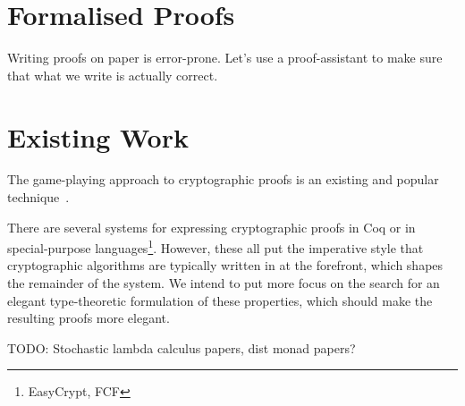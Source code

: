 % 
% 
% 

\section{Formalised Proofs}

Writing proofs on paper is error-prone.  Let's use a proof-assistant to make sure that what we write is actually
correct.

\section{Existing Work}

The game-playing approach to cryptographic proofs is an existing and popular technique~\cite{codebasedgames}.

There are several systems for expressing cryptographic proofs in Coq or in special-purpose
languages\footnote{EasyCrypt, FCF}.  However, these all put the imperative style that cryptographic algorithms are
typically written in at the forefront, which shapes the remainder of the system.  We intend to put more focus on the
search for an elegant type-theoretic formulation of these properties, which should make the resulting proofs more
elegant.

TODO: Stochastic lambda calculus papers, dist monad papers?
